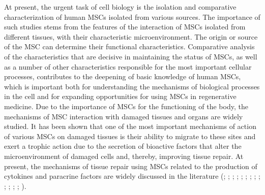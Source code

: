 \documentclass[alpha-refs]{wiley-article}
\begin{document}
At present, the urgent task of cell biology is the isolation and comparative characterization of human MSCs isolated from various sources.
The importance of such studies stems from the features of the interaction of MSCs isolated from different tissues, with their characteristic microenvironment.
The origin or source of the MSC can determine their functional characteristics.
Comparative analysis of the characteristics that are decisive in maintaining the status of MSCs, as well as a number of other characteristics responsible for the most important cellular processes, contributes to the deepening of basic knowledge of human MSCs, which is important both for understanding the mechanisms of biological processes in the cell and for expanding opportunities for using MSCs in regenerative medicine.
Due to the importance of MSCs for the functioning of the body, the mechanisms of MSC interaction with damaged tissues and organs are widely studied.
It has been shown that one of the most important mechanisms of action of various MSCs on damaged tissues is their ability to migrate to these sites and exert a trophic action due to the secretion of bioactive factors that alter the microenvironment of damaged cells and, thereby, improving tissue repair.
At present, the mechanisms of tissue repair using MSCs related to the production of cytokines and paracrine factors are widely discussed in the literature (\cite{phinney2007concise}; \cite{m2011mesenchymal}; \cite{guiducci2011bone}; \cite{gruenloh2011characterization}; \cite{huang2013effects}; \cite{luo2013mesenchymal}; \cite{ando2014stem}; \cite{hendijani2015human}; \cite{hendijani2015effect}; \cite{danieli2016testing}; \cite{julianto2016topical}; \cite{teixeira2017impact}; \cite{vulcano2016wharton}; \cite{zachar2016activation}).
\end{document}
